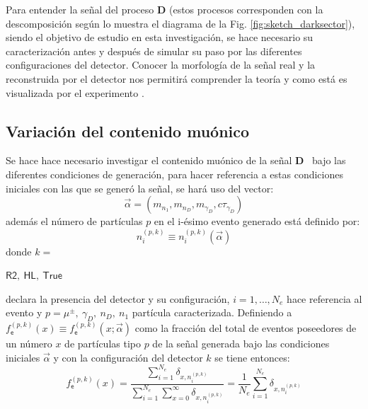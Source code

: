 Para entender la señal del proceso \MSSM\textbf{D} (estos procesos corresponden con la descomposición según lo muestra el diagrama de la Fig. \ref{fig:sketch_darksector}), siendo el objetivo de estudio en esta investigación, se hace necesario su caracterización antes y después de simular su paso por las diferentes configuraciones del detector. Conocer la morfología de la señal real y la reconstruida por el detector nos permitirá comprender la teoría y como está es visualizada por el experimento \CMS.

\subsection{Variación del contenido muónico}

Se hace hace necesario investigar el contenido muónico de la señal \MSSM\textbf{D}~ bajo las diferentes condiciones de generación, para hacer referencia a estas condiciones iniciales con las que se generó la señal, se hará uso del vector:
\begin{equation}
\vec{\alpha} = (m_{n_1}, m_{n_D}, m_{\gamma_D}, c\tau_{\gamma_D})
\end{equation}
además el número de partículas $p$ en el i-ésimo evento generado está definido por:
\begin{equation}\label{numero_particulas}
n_i^{(p,k)} \equiv n_i^{(p,k)} (\vec{\alpha})
\end{equation}
donde 
$k =$ \begin{small}$\textsf{R2},~\textsf{HL}, ~\textsf{True}$\end{small}  declara la presencia del detector y su configuración, 
$i = 1, \ldots, N_{e}$ hace referencia al evento y 
$p = \mu^\pm, ~ \gamma_D, ~n_D, ~n_1$ partícula caracterizada.
Definiendo a $f^{(p, k)}_\textsf{e} (x)\equiv f^{(p, k)}_\textsf{e} (x; \vec{\alpha})$ como la fracción del total de eventos poseedores de un número $x$ de partículas tipo $p$ de la señal generada bajo las condiciones iniciales $\vec{\alpha}$ y con la configuración del detector $k$ se tiene entonces:
\begin{equation}\label{fe}
f^{(p, k)}_\textsf{e} (x)  = \dfrac{\sum\limits_{i=1}^{N_e} \delta_{x,n_i^{(p,k)}}}{\sum\limits_{i=1}^{N_e} \sum\limits_{x=0}^\infty \delta_{x,n_i^{(p,k)}}} = \dfrac{1}{N_e} \sum_{i=1}^{N_e} \delta_{x,n_i^{(p,k)}}
\end{equation}
